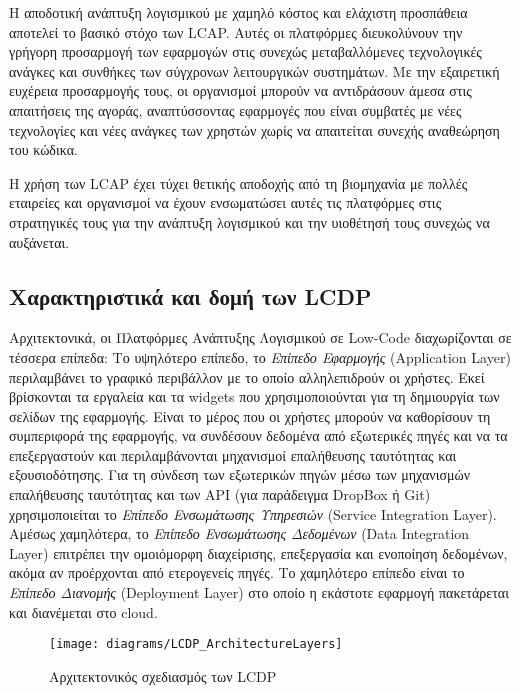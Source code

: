         Η αποδοτική ανάπτυξη λογισμικού με χαμηλό κόστος και ελάχιστη προσπάθεια αποτελεί το βασικό στόχο των LCAP. Αυτές οι πλατφόρμες διευκολύνουν την γρήγορη προσαρμογή των εφαρμογών στις συνεχώς μεταβαλλόμενες τεχνολογικές ανάγκες και συνθήκες των σύγχρονων λειτουργικών συστημάτων. Με την εξαιρετική ευχέρεια προσαρμογής τους, οι οργανισμοί μπορούν να αντιδράσουν άμεσα στις απαιτήσεις της αγοράς, αναπτύσσοντας εφαρμογές που είναι συμβατές με νέες τεχνολογίες και νέες ανάγκες των χρηστών χωρίς να απαιτείται συνεχής αναθεώρηση του κώδικα.

        Η χρήση των LCAP έχει τύχει θετικής αποδοχής από τη βιομηχανία με πολλές εταιρείες και οργανισμοί να έχουν ενσωματώσει αυτές τις πλατφόρμες στις στρατηγικές τους για την ανάπτυξη λογισμικού και την υιοθέτησή τους συνεχώς να αυξάνεται. \cite{Bock2021,Bucaioni2022,Sahay2020}

        \subsection{Χαρακτηριστικά και δομή των LCDP}
            Αρχιτεκτονικά, οι Πλατφόρμες Ανάπτυξης Λογισμικού σε Low-Code διαχωρίζονται σε τέσσερα επίπεδα: Το υψηλότερο επίπεδο, το \textit{Επίπεδο Εφαρμογής} (Application Layer) περιλαμβάνει το γραφικό περιβάλλον με το οποίο αλληλεπιδρούν οι χρήστες. Εκεί βρίσκονται τα εργαλεία και τα widgets που χρησιμοποιούνται για τη δημιουργία των σελίδων της εφαρμογής. Είναι το μέρος που οι χρήστες μπορούν να καθορίσουν τη συμπεριφορά της εφαρμογής, να συνδέσουν δεδομένα από εξωτερικές πηγές και να τα επεξεργαστούν και περιλαμβάνονται μηχανισμοί επαλήθευσης ταυτότητας και εξουσιοδότησης. Για τη σύνδεση των εξωτερικών πηγών μέσω των μηχανισμών επαλήθευσης ταυτότητας και των API (για παράδειγμα DropBox ή Git) χρησιμοποιείται το \textit{Επίπεδο Ενσωμάτωσης Υπηρεσιών} (Service Integration Layer). Αμέσως χαμηλότερα, το \textit{Επίπεδο Ενσωμάτωσης Δεδομένων} (Data Integration Layer) επιτρέπει την ομοιόμορφη διαχείρισης, επεξεργασία και ενοποίηση δεδομένων, ακόμα αν προέρχονται από ετερογενείς πηγές. Το χαμηλότερο επίπεδο είναι το \textit{Επίπεδο Διανομής} (Deployment Layer) στο οποίο η εκάστοτε εφαρμογή πακετάρεται και διανέμεται στο cloud. \cite{Sahay2020}

            \begin{figure}[h!] \noindent \centering
                    \texttt{[image: diagrams/LCDP\_ArchitectureLayers]}
                    \caption{Αρχιτεκτονικός σχεδιασμός των LCDP \cite{Sahay2020}}
            \end{figure}

